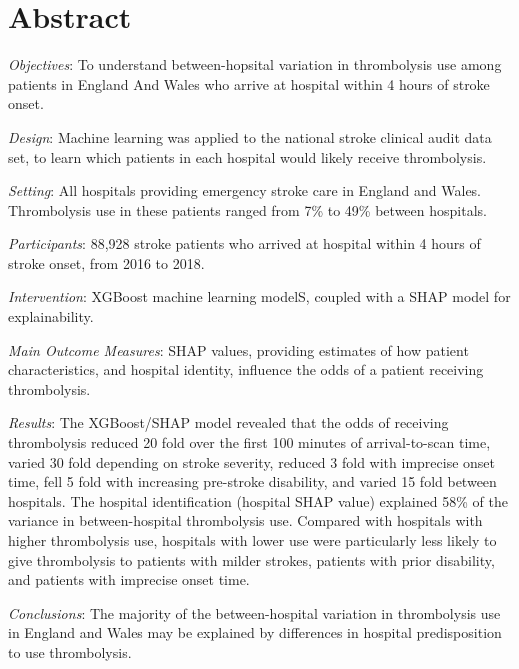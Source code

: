 \section*{Abstract}

\emph{Objectives}: To understand between-hopsital variation in thrombolysis use among patients in England And Wales who arrive at hospital within 4 hours of stroke onset.

\emph{Design}: Machine learning was applied to the national stroke clinical audit data set, to learn which patients in each hospital would likely receive thrombolysis.

\emph{Setting}: All hospitals providing emergency stroke care in England and Wales. Thrombolysis use in these patients ranged from 7\% to 49\% between hospitals.

\emph{Participants}: 88,928 stroke patients who arrived at hospital within 4 hours of stroke onset, from 2016 to 2018.

\emph{Intervention}: XGBoost machine learning modelS, coupled with a SHAP model for explainability.

\emph{Main Outcome Measures}: SHAP values, providing estimates of how patient characteristics, and hospital identity, influence the odds of a patient receiving thrombolysis.

\emph{Results}: The XGBoost/SHAP model revealed that the odds of receiving thrombolysis reduced 20 fold over the first 100 minutes of arrival-to-scan time, varied 30 fold depending on stroke severity, reduced 3 fold with imprecise onset time, fell 5 fold with increasing pre-stroke disability, and varied 15 fold between hospitals. The hospital identification (hospital SHAP value) explained 58\% of the variance in between-hospital thrombolysis use. Compared with hospitals with higher thrombolysis use, hospitals with lower use were particularly less likely to give thrombolysis to patients with milder strokes, patients with prior disability, and patients with imprecise onset time.

\emph{Conclusions}: The majority of the between-hospital variation in thrombolysis use in England and Wales may be explained by differences in hospital predisposition to use thrombolysis.